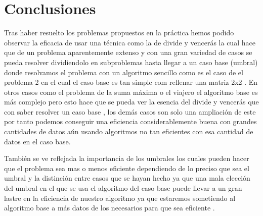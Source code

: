 \documentclass[11pt,openany]{book}
\begin{document}
\chapter{Conclusiones}

Tras haber resuelto los problemas propuestos en la práctica hemos podido observar la eficacia
de usar una técnica como la de divide y vencerás la cual hace que de un problema aparentemente 
extenso y con una gran variedad de casos se pueda resolver dividiendolo  en subproblemas hasta llegar 
a un caso base (umbral) donde resolvamos el problema con un algoritmo sencillo como es el caso de 
el problema 2 en el cual el caso base es tan simple com rellenar una matriz 2x2 . En otros casos como 
el problema de la suma máxima o  el viajero  el algoritmo base es más complejo pero esto hace que se pueda ver la esencia del 
divide y vencerás que con saber resolver un caso base , los demás casos son solo una ampliación de este por tanto podemos conseguir una
eficiencia considerablemente buena con grandes cantidades de datos  aún usando algoritmos no tan eficientes con esa cantidad de  datos en el caso base.

También se ve reflejada la importancia de los umbrales los cuales pueden hacer que el problema sea mas o menos eficiente 
dependiendo de lo preciso que sea el umbral y la distinción entre casos que se hayan  hecho ya que una mala elección 
del umbral en el que se usa el algoritmo del caso base puede llevar a un gran lastre en la eficiencia de nuestro algoritmo 
ya que estaremos sometiendo al algoritmo  base a más datos de los necesarios para que sea eficiente .
\end{document}
